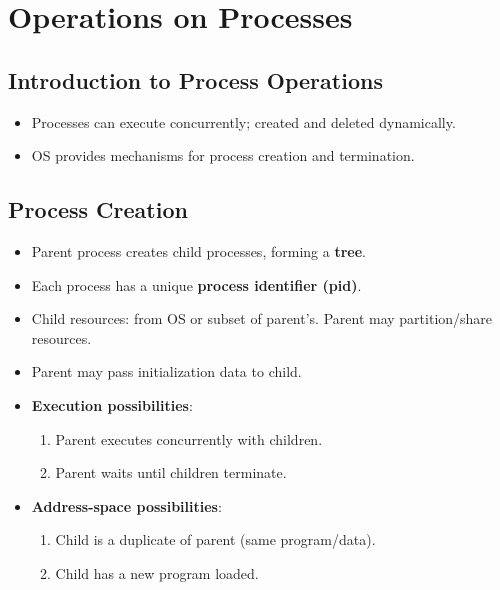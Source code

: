 \section{Operations on Processes}\label{sec:3.3}

\subsection{Introduction to Process Operations}
\begin{itemize}
    \item Processes can execute concurrently; created and deleted dynamically.
    \item OS provides mechanisms for process creation and termination.
\end{itemize}

\subsection{Process Creation}
\begin{itemize}
    \item Parent process creates child processes, forming a \textbf{tree}.
    \item Each process has a unique \textbf{process identifier (pid)}.
    \item Child resources: from OS or subset of parent's. Parent may partition/share resources.
    \item Parent may pass initialization data to child.
    \item \textbf{Execution possibilities}:
        \begin{enumerate}
            \item Parent executes concurrently with children.
            \item Parent waits until children terminate.
        \end{enumerate}
    \item \textbf{Address-space possibilities}:
        \begin{enumerate}
            \item Child is a duplicate of parent (same program/data).
            \item Child has a new program loaded.
        \end{enumerate}
\end{itemize}

